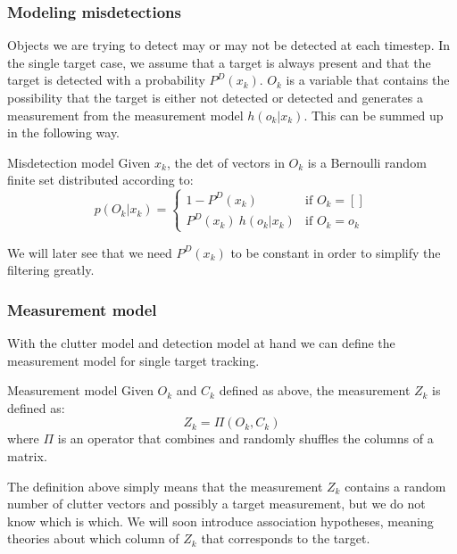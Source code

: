 \subsubsection{Modeling misdetections}
Objects we are trying to detect may or may not be detected at each timestep. In the single target case, we assume that a target is always present and that the target is detected with a probability $P^D(x_k)$. $O_k$ is a variable that contains the possibility that the target is either not detected or detected and generates a measurement from the measurement model $h(o_k \vert x_k)$. This can be summed up in the following way.

\begin{definition}{Misdetection model}
Given $x_k$, the det of vectors in $O_k$ is a Bernoulli random finite set distributed according to:
\begin{equation}
    p(O_k \vert x_k) = 
    \begin{cases}
        1 - P^D(x_k) & \text{if } O_k = [] \\
        P^D(x_k) \: h(o_k \vert x_k) & \text{if } O_k = o_k
    \end{cases}
\end{equation}
\end{definition}

We will later see that we need $P^D(x_k)$ to be constant in order to simplify the filtering greatly.

\subsubsection{Measurement model}
With the clutter model and detection model at hand we can define the measurement model for single target tracking. 

\begin{definition}{Measurement model}
Given $O_k$ and $C_k$ defined as above, the measurement $Z_k$ is defined as:
\begin{equation}
    Z_k = \Pi(O_k, C_k)
\end{equation}
where $\Pi$ is an operator that combines and randomly shuffles the columns of a matrix.
\end{definition}

The definition above simply means that the measurement $Z_k$ contains a random number of clutter vectors and possibly a target measurement, but we do not know which is which. We will soon introduce association hypotheses, meaning theories about which column of $Z_k$ that corresponds to the target. 

